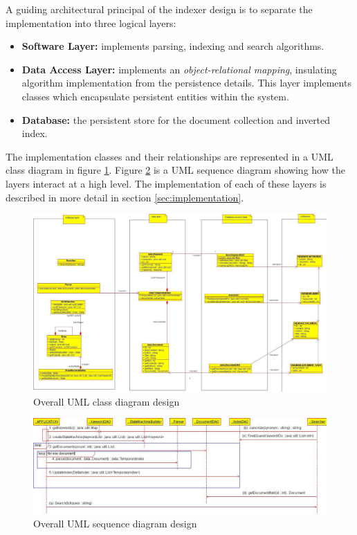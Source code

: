 \documentclass[10pt]{report}
\begin{document}
A guiding architectural principal of the indexer design is to separate the implementation
into three logical layers:
\begin{itemize}
\item \textbf{Software Layer:} implements parsing, indexing and search
  algorithms.
\item \textbf{Data Access Layer:} implements an
  \textit{object-relational mapping}, insulating algorithm
  implementation from the persistence details. This layer implements
  classes which encapsulate persistent entities within the system.
\item \textbf{Database:} the persistent store for the document
  collection and inverted index.
\end{itemize}

The implementation classes and their relationships are represented in
a UML class diagram in figure \ref{fig:overallclassdiagram}. Figure
\ref{fig:overallsequencediagram} is a UML sequence diagram showing how
the layers interact at a high level.  The implementation of each of
these layers is described in more detail in section
\ref{sec:implementation}.

\begin{figure}
  \begin{center}
        \includegraphics[width=\textwidth,height=!]{overallclassdiagram}
  \end{center}
  \caption{Overall UML class diagram design}
  \label{fig:overallclassdiagram}
\end{figure} 

\begin{figure}
  \begin{center}
        \includegraphics[width=\textwidth,height=!]{overallsequencediagram}
  \end{center}
  \caption{Overall UML sequence diagram design}
  \label{fig:overallsequencediagram}
\end{figure} 
\end{document}
